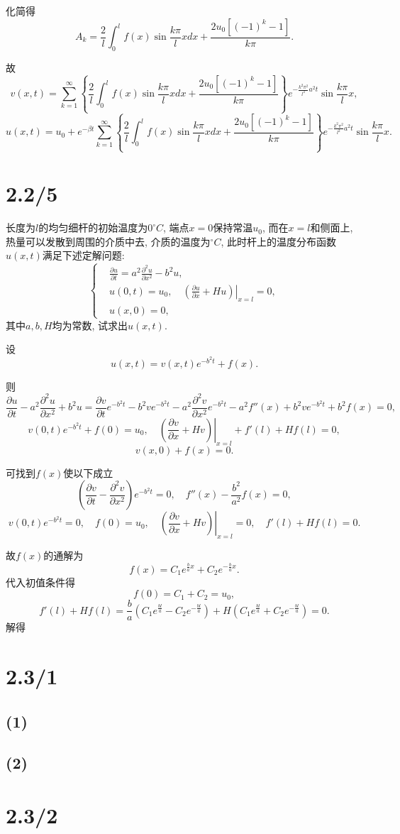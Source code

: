 \documentclass[11pt,a4paper]{article}
\begin{document}
化简得
$$A_k=\frac{2}{l}\int_0^l f(x)\sin \frac{k\pi}{l} xdx+\frac{2u_0[(-1)^k-1]}{k\pi}.$$

故
$$v(x,t)=\sum_{k=1}^\infty \left\{\frac{2}{l}\int_0^l f(x)\sin \frac{k\pi}{l} xdx+\frac{2u_0[(-1)^k-1]}{k\pi}\right\} e^{-\frac{k^2\pi^2}{l^2}a^2t}\sin \frac{k\pi}{l} x,$$
$$u(x,t)=u_0+e^{-\beta t}\sum_{k=1}^\infty \left\{\frac{2}{l}\int_0^l f(x)\sin \frac{k\pi}{l} xdx+\frac{2u_0[(-1)^k-1]}{k\pi}\right\} e^{-\frac{k^2\pi^2}{l^2}a^2t}\sin \frac{k\pi}{l} x.$$

\section{2.2/5}
\begin{problem}
长度为$l$的均匀细杆的初始温度为$0^\circ C$, 端点$x=0$保持常温$u_0$, 而在$x=l$和侧面上, 热量可以发散到周围的介质中去, 介质的温度为$^\circ C$, 此时杆上的温度分布函数$u(x,t)$满足下述定解问题:
$$\left\{\begin{aligned}
     & \frac{\partial u}{\partial t}=a^2\frac{\partial^2u}{\partial x^2}-b^2u,              \\
     & u(0,t)=u_0,\quad \left.\left(\frac{\partial u}{\partial x}+Hu\right)\right|_{x=l}=0, \\
     & u(x,0)=0,
  \end{aligned}\right.$$
其中$a,b,H$均为常数, 试求出$u(x,t)$.
\end{problem}

设
$$u(x,t)=v(x,t)e^{-b^2t}+f(x).$$

则
$$\frac{\partial u}{\partial t}-a^2\frac{\partial^2u}{\partial x^2}+b^2u=\frac{\partial v}{\partial t}e^{-b^2t}-b^2ve^{-b^2t}-a^2\frac{\partial^2v}{\partial x^2}e^{-b^2t}-a^2f''(x)+b^2ve^{-b^2t}+b^2f(x)=0,$$
$$v(0,t)e^{-b^2t}+f(0)=u_0,\quad \left.\left(\frac{\partial v}{\partial x}+Hv\right)\right|_{x=l}+f'(l)+Hf(l)=0,$$
$$v(x,0)+f(x)=0.$$

可找到$f(x)$使以下成立
$$\left(\frac{\partial v}{\partial t}-\frac{\partial^2v}{\partial x^2}\right)e^{-b^2t}=0,\quad f''(x)-\frac{b^2}{a^2}f(x)=0,$$
$$v(0,t)e^{-b^2t}=0,\quad f(0)=u_0,\quad \left.\left(\frac{\partial v}{\partial x}+Hv\right)\right|_{x=l}=0,\quad f'(l)+Hf(l)=0.$$

故$f(x)$的通解为
$$f(x)=C_1e^{\frac{b}{a}x}+C_2e^{-\frac{b}{a}x}.$$
代入初值条件得
$$f(0)=C_1+C_2=u_0,$$
$$f'(l)+Hf(l)=\frac{b}{a}\left(C_1e^{\frac{bl}{a}}-C_2e^{-\frac{bl}{a}}\right)+H\left(C_1e^{\frac{bl}{a}}+C_2e^{-\frac{bl}{a}}\right)=0.$$
解得
$$$$

\section{2.3/1}

\subsection*{(1)}
\subsection*{(2)}

\section{2.3/2}
\end{document}
